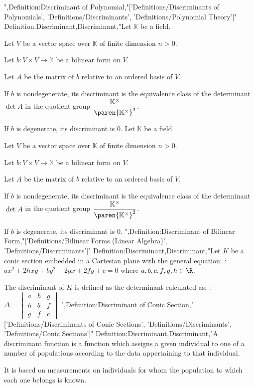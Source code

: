 ",Definition:Discriminant of Polynomial,"['Definitions/Discriminants of Polynomials', 'Definitions/Discriminants', 'Definitions/Polynomial Theory']"
Definition:Discriminant,Discriminant,"Let $\mathbb K$ be a field.

Let $V$ be a vector space over $\mathbb K$ of finite dimension $n>0$.

Let $b : V\times V \to \mathbb K$ be a bilinear form on $V$.

Let $A$ be the matrix of $b$ relative to an ordered basis of $V$.


If $b$ is nondegenerate, its discriminant is the equivalence class of the determinant $\det A$ in the quotient group $\dfrac {\mathbb K^\times} {\paren {\mathbb K^\times}^2}$.

If $b$ is degenerate, its discriminant is $0$.
Let $\mathbb K$ be a field.

Let $V$ be a vector space over $\mathbb K$ of finite dimension $n>0$.

Let $b : V\times V \to \mathbb K$ be a bilinear form on $V$.

Let $A$ be the matrix of $b$ relative to an ordered basis of $V$.


If $b$ is nondegenerate, its discriminant is the equivalence class of the determinant $\det A$ in the quotient group $\dfrac {\mathbb K^\times} {\paren {\mathbb K^\times}^2}$.

If $b$ is degenerate, its discriminant is $0$.
",Definition:Discriminant of Bilinear Form,"['Definitions/Bilinear Forms (Linear Algebra)', 'Definitions/Discriminants']"
Definition:Discriminant,Discriminant,"Let $K$ be a conic section embedded in a Cartesian plane with the general equation:
:$a x^2 + 2 h x y + b y^2 + 2 g x + 2 f y + c = 0$
where $a, b, c, f, g, h \in \R$.


The discriminant of $K$ is defined as the determinant calculated as:
:$\Delta = \begin {vmatrix} a & h & g \\ h & b & f \\ g & f & c \end {vmatrix}$
",Definition:Discriminant of Conic Section,"['Definitions/Discriminants of Conic Sections', 'Definitions/Discriminants', 'Definitions/Conic Sections']"
Definition:Discriminant,Discriminant,"A discriminant function is a function which assigns a given individual to one of a number of populations according to the data appertaining to that individual.

It is based on measurements on individuals for whom the population to which each one belongs is known.

